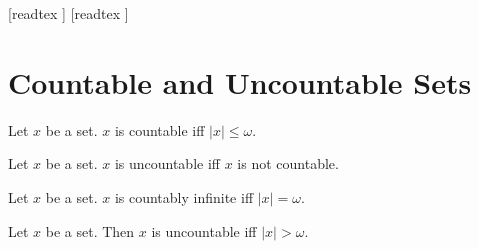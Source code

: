 \documentclass[10pt]{article}
\begin{document}
  \begin{imports}
    \begin{forthel}
      [readtex ]
      [readtex ]
    \end{forthel}
  \end{imports}


  \section*{Countable and Uncountable Sets}

  \begin{forthel}
    \begin{definition}[id=SET_THEORY_07_8808604616359936,printid]
      Let $x$ be a set.
      $x$ is countable iff $|x| \leq \omega$.
    \end{definition}
  \end{forthel}

  \begin{forthel}
    \begin{definition}[id=SET_THEORY_07_2935263915409408,printid]
      Let $x$ be a set.
      $x$ is uncountable iff $x$ is not countable.
    \end{definition}
  \end{forthel}

  \begin{forthel}
    \begin{definition}[id=SET_THEORY_07_5679866426949632,printid]
      Let $x$ be a set.
      $x$ is countably infinite iff $|x| = \omega$.
    \end{definition}
  \end{forthel}

  \begin{forthel}
    \begin{proposition}[id=SET_THEORY_07_4281623468048384,printid]
      Let $x$ be a set.
      Then $x$ is uncountable iff $|x| > \omega$.
    \end{proposition}
  \end{forthel}
\end{document}
